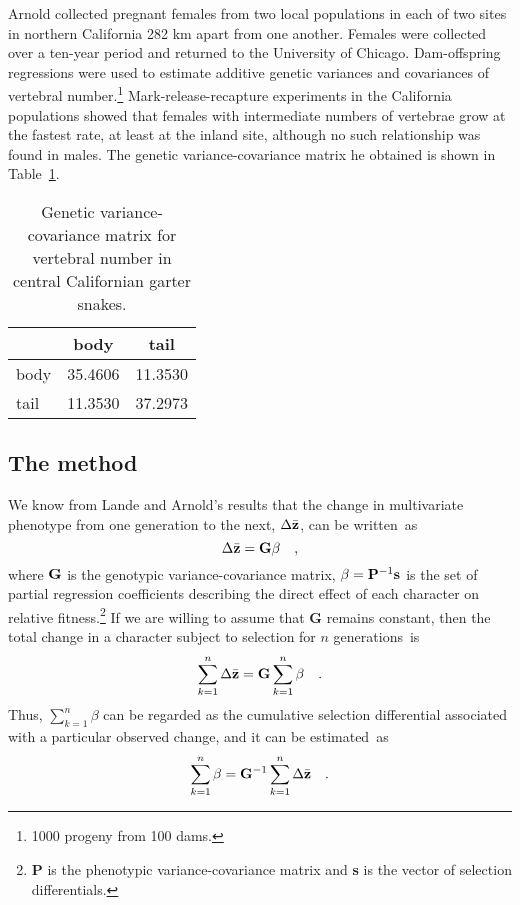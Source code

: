 \documentclass[12pt]{article}
\begin{document}
Arnold collected pregnant females from two local populations in each
of two sites in northern California 282 km apart from one
another. Females were collected over a ten-year period and returned to
the University of Chicago. Dam-offspring regressions were used to
estimate additive genetic variances and covariances of vertebral
number.\footnote{1000 progeny from 100 dams.}  Mark-release-recapture
experiments in the California populations showed that females with
intermediate numbers of vertebrae grow at the fastest rate, at least
at the inland site, although no such relationship was found in
males. The genetic variance-covariance matrix he obtained is shown in
Table~\ref{table:arnold-data}.

\begin{table}
\begin{center}
\begin{tabular}{l|cc}
\hline\hline
     & body    & tail \\
\hline
body & 35.4606 & 11.3530 \\
tail & 11.3530 & 37.2973 \\
\hline
\end{tabular}
\end{center}
\caption{Genetic variance-covariance matrix for vertebral number in
central Californian garter snakes.}\label{table:arnold-data}
\end{table}

\subsection*{The method}

We know from Lande and Arnold's results that the change in
multivariate phenotype from one generation to the next,
$\Delta\bar{\bf z}$, can be written~as
\[
\Delta\bar{\bf z} = {\bf G\beta} \quad ,
\]
where $\bf G$ is the genotypic variance-covariance matrix, ${\bf\beta}
= {\bf P}^{-1}{\bf s}$ is the set of partial regression coefficients
describing the direct effect of each character on relative
fitness.\footnote{{\bf P} is the phenotypic variance-covariance matrix
and {\bf s} is the vector of selection differentials.} If we are
willing to assume that {\bf G} remains constant, then the total change
in a character subject to selection for $n$ generations~is
\[
\sum_{k=1}^n \Delta\bar{\bf z} = {\bf G}\sum_{k=1}^n\beta \quad .
\]
Thus, $\sum_{k=1}^n\beta$ can be regarded as the cumulative selection
differential associated with a particular observed change, and it can
be estimated~as
\[
\sum_{k=1}^n\beta = {\bf G}^{-1}\sum_{k=1}^n \Delta\bar{\bf z}\quad .
\]
\end{document}

